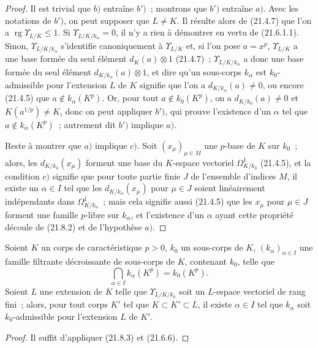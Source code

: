 \begin{proof}
Il est trivial que $b)$ entraîne $b')$~; montrons que $b')$ entraîne $a)$.
Avec les notations de $b')$, on peut supposer que $L\ne K$. Il résulte alors
de (21.4.7) que l'on a $\operatorname{rg}\Upsilon_{L/K}\leqslant1$. Si
$\Upsilon_{L/K/k_\alpha}=0$, il n'y a rien à démontrer en vertu de
(21.6.1.1). Sinon, $\Upsilon_{L/K/k_\alpha}$ s'identifie canoniquement à
$\Upsilon_{L/K}$ et, si l'on pose $a=x^p$, $\Upsilon_{L/K}$ a une base
formée du seul élément $d_K(a)\otimes1$ (21.4.7)~;
$\Upsilon_{L/K/k_\alpha}$ a donc une base formée du seul élément
$d_{K/k_\alpha}(a)\otimes1$, et dire qu'un sous-corps $k_\alpha$ est
$k_0$-admissible pour l'extension $L$ de $K$ signifie que l'on a
$d_{K/k_\alpha}(a)\ne0$, ou encore (21.4.5) que
$a\notin k_\alpha(K^p)$. Or, pour tout $a\notin k_0(K^p)$, on a
$d_{K/k_0}(a)\ne0$ et $K(a^{1/p})\ne K$, donc on peut appliquer $b')$, qui
prouve l'existence d'un $\alpha$ tel que $a\notin k_\alpha(K^p)$~;
autrement dit $b')$ implique $a)$.

Reste à montrer que $a)$ implique $c)$. Soit $(x_\mu)_{\mu\in M}$ une
$p$-base de $K$ sur $k_0$~; alors, les $d_{K/k_0}(x_\mu)$ forment une base du
$K$-espace vectoriel $\Omega^1_{K/k_0}$ (21.4.5), et la condition $c)$
signifie que pour toute partie finie $J$ de l'ensemble d'indices $M$, il
existe un $\alpha\in I$ tel que les $d_{K/k_\alpha}(x_\mu)$ pour $\mu\in J$
soient linéairement indépendants dans $\Omega^1_{K/k_\alpha}$~; mais cela
signifie aussi (21.4.5) que les $x_\mu$ pour $\mu\in J$ forment une famille
$p$-libre sur $k_\alpha$, et l'existence d'un $\alpha$ ayant cette propriété
découle de (21.8.2) et de l'hypothèse $a)$.
\end{proof}

\begin{corollary}[21.8.4]
\label{0.21.8.4-fr}
Soient $K$ un corps de caractéristique $p>0$, $k_0$ un sous-corps de $K$,
$(k_\alpha)_{\alpha\in I}$ une famille filtrante décroissante de sous-corps
de $K$, contenant $k_0$, telle que
\[
  \bigcap_{\alpha\in I}k_\alpha(K^p)=k_0(K^p).
\]
Soient $L$ une extension de $K$ telle que $\Upsilon_{L/K/k_0}$ soit un
$L$-espace vectoriel de rang fini~; alors, pour tout corps $K'$ tel que
$K\subset K'\subset L$, il existe $\alpha\in I$ tel que $k_\alpha$ soit
$k_0$-admissible pour l'extension $L$ de $K'$.
\end{corollary}

\begin{proof}
Il suffit d'appliquer (21.8.3) et (21.6.6).
\end{proof}

